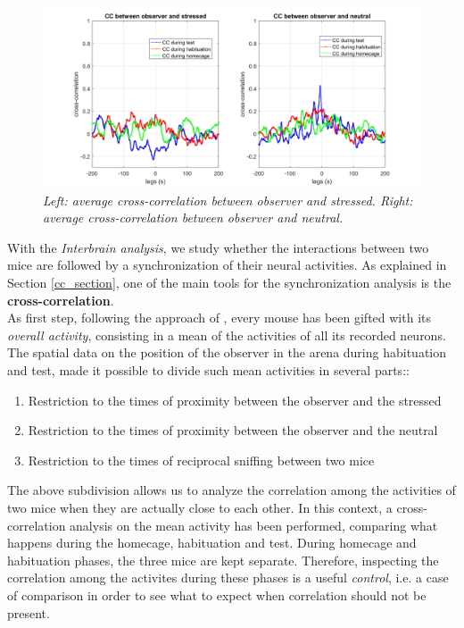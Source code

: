 \documentclass[12pt, a4paper]{report}
\begin{document}
\begin{figure}[H]
	
	\begin{center}
		\hspace*{-1.4cm}
		\includegraphics[scale=.5]{average_cc.png} 
	\end{center} 
	\caption{\textit{Left: average cross-correlation between observer and stressed. Right: average cross-correlation between observer and neutral.}} \label{cc}
	
\end{figure}

With the \textit{Interbrain analysis}, we study whether the interactions between two mice are followed by a synchronization of their neural activities. As explained in Section \ref{cc_section}, one of the main tools for the synchronization analysis is the \textbf{cross-correlation}.\\
As first step, following the approach of \cite{16}, every mouse has been gifted with its \textit{overall activity}, consisting in a mean of the activities of all its recorded neurons. The spatial data on the position of the observer in the arena during habituation and test, made it possible to divide such mean activities in several parts::

\begin{enumerate}
	\item Restriction to the times of proximity between the observer and the stressed
	\item Restriction to the times of proximity between the observer and the neutral
	\item Restriction to the times of reciprocal sniffing between two mice
\end{enumerate}

The above subdivision allows us to analyze the correlation among the activities of two mice when they are actually close to each other. In this context, a cross-correlation analysis on the mean activity has been performed, comparing what happens during the homecage, habituation and test. During homecage and habituation phases, the three mice are kept separate. Therefore, inspecting the correlation among the activites during these phases is a useful \textit{control}, i.e. a case of comparison in order to see what to expect when correlation should not be present.
\\
\end{document}
